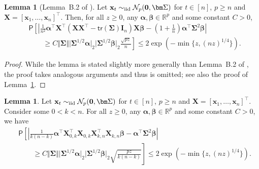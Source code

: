 \documentclass[11pt, a4paper]{article}
\newcommand{\mbf}{\mathbf}
\newcommand{\mc}{\mathcal}
\renewcommand{\l}{\left}
\renewcommand{\r}{\right}
\newcommand{\tr}[0]{\mathsf{tr}}
\newcommand{\p}{\mathsf{P}}
\newcommand{\R}{\mathbb{R}}
\newcommand{\iid}{\text{\upshape iid}}
\theoremstyle{definition}
\theoremstyle{definition}
\theoremstyle{definition}
\newtheorem{lem}[thm]{Lemma}
\theoremstyle{definition}
\theoremstyle{definition}
\theoremstyle{remark}
\theoremstyle{definition}
\theoremstyle{definition}
\theoremstyle{definition}
\begin{document}
\begin{lem}[Lemma~B.2 of \citealp{VeGa18}]
\label{lem:gauss:chaos}
Let $\mbf x_t \sim_{\iid} \mc N_p(\mbf 0, \bm \Sigma)$ for $t \in[n]$, $p \ge n$ and $ \mbf X = [\mbf x_1, \ldots, \mbf x_n]^\top$. Then, for all $z \ge 0$, any $\bm\alpha, \bm\beta \in \R^p$ and some constant $C > 0$, 
\begin{align*}
& \p\l[\l\vert  \frac{1}{n^2} \bm\alpha^\top \mbf X^\top \l( \mbf X \mbf X^\top - \tr(\bm\Sigma) \mbf I_n \r) \mbf X \bm\beta - \l(1 + \frac{1}{n}\r) \bm\alpha^\top \bm\Sigma^2 \bm\beta \r\vert \r.
\\
& \qquad \l. \ge C \Vert \bm\Sigma \Vert \vert \bm\Sigma^{1/2} \bm\alpha \vert_2 \vert \bm\Sigma^{1/2} \bm\beta \vert_2 \frac{\sqrt{pz}}{n} \r] \le 2 \exp\l(-\min\bigl\{z, (nz)^{1/4}\bigr\}\r).
\end{align*}
\end{lem}

\begin{proof}
While the lemma is stated slightly more generally than Lemma~B.2 of \cite{VeGa18}, the proof takes analogous arguments and thus is omitted; see also the proof of Lemma~\ref{lem:gauss:chaos:two}.
\end{proof}

\begin{lem}
\label{lem:gauss:chaos:two}
Let $\mbf x_t \sim_{\iid} \mc N_p(\mbf 0, \bm \Sigma)$ for $t \in[n]$, $p \ge n$ and $ \mbf X = [\mbf x_1, \ldots, \mbf x_n]^\top$. 
Consider some $0 < k < n$. 
For all $z \ge 0$, any $\bm\alpha, \bm\beta \in \R^p$ and some constant $C > 0$, we have
\begin{align*}
& \p\l[\l\vert  \frac{1}{k (n - k)} \bm\alpha^\top \mbf X_{0, k}^\top \mbf X_{0, k} \mbf X_{k, n}^\top \mbf X_{k, n} \bm\beta - \bm\alpha^\top \bm\Sigma^2 \bm\beta \r\vert \r. 
\\ 
& \qquad \l. \ge C \Vert \bm\Sigma \Vert \vert \bm\Sigma^{1/2} \bm\alpha \vert_2 \vert \bm\Sigma^{1/2} \bm\beta \vert_2 \sqrt{\frac{pz}{k (n - k)}} \r] \le 2 \exp\l(-\min\bigl\{z, (nz)^{1/4}\bigr\}\r).
\end{align*}
\end{lem}
\end{document}
